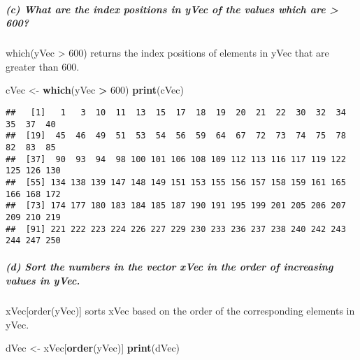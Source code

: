\documentclass[
]{article}
\newenvironment{Shaded}{\begin{snugshade}}{\end{snugshade}}
\newcommand{\DecValTok}[1]{\textcolor[rgb]{0.00,0.00,0.81}{#1}}
\newcommand{\FunctionTok}[1]{\textcolor[rgb]{0.13,0.29,0.53}{\textbf{#1}}}
\newcommand{\NormalTok}[1]{#1}
\newcommand{\OtherTok}[1]{\textcolor[rgb]{0.56,0.35,0.01}{#1}}
\newcommand{\SpecialCharTok}[1]{\textcolor[rgb]{0.81,0.36,0.00}{\textbf{#1}}}
\begin{document}
\subparagraph{(c) What are the index positions in yVec of the values
which are \textgreater{}
600?}\label{c-what-are-the-index-positions-in-yvec-of-the-values-which-are-600}

which(yVec \textgreater{} 600) returns the index positions of elements
in yVec that are greater than 600.

\begin{Shaded}
\begin{Highlighting}[]
\NormalTok{cVec }\OtherTok{\textless{}{-}} \FunctionTok{which}\NormalTok{(yVec }\SpecialCharTok{\textgreater{}} \DecValTok{600}\NormalTok{)}
\FunctionTok{print}\NormalTok{(cVec)}
\end{Highlighting}
\end{Shaded}

\begin{verbatim}
##   [1]   1   3  10  11  13  15  17  18  19  20  21  22  30  32  34  35  37  40
##  [19]  45  46  49  51  53  54  56  59  64  67  72  73  74  75  78  82  83  85
##  [37]  90  93  94  98 100 101 106 108 109 112 113 116 117 119 122 125 126 130
##  [55] 134 138 139 147 148 149 151 153 155 156 157 158 159 161 165 166 168 172
##  [73] 174 177 180 183 184 185 187 190 191 195 199 201 205 206 207 209 210 219
##  [91] 221 222 223 224 226 227 229 230 233 236 237 238 240 242 243 244 247 250
\end{verbatim}

\subparagraph{(d) Sort the numbers in the vector xVec in the order of
increasing values in
yVec.}\label{d-sort-the-numbers-in-the-vector-xvec-in-the-order-of-increasing-values-in-yvec.}

xVec{[}order(yVec){]} sorts xVec based on the order of the corresponding
elements in yVec.

\begin{Shaded}
\begin{Highlighting}[]
\NormalTok{dVec }\OtherTok{\textless{}{-}}\NormalTok{ xVec[}\FunctionTok{order}\NormalTok{(yVec)]}
\FunctionTok{print}\NormalTok{(dVec)}
\end{Highlighting}
\end{Shaded}
\end{document}

